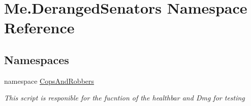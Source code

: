 \hypertarget{namespaceMe_1_1DerangedSenators}{}\section{Me.\+Deranged\+Senators Namespace Reference}
\label{namespaceMe_1_1DerangedSenators}
\subsection*{Namespaces}
\begin{DoxyCompactItemize}
\item 
namespace \hyperlink{namespaceMe_1_1DerangedSenators_1_1CopsAndRobbers}{Cops\+And\+Robbers}
\begin{DoxyCompactList}\small\item\em This script is responible for the fucntion of the healthbar and Dmg for testing \end{DoxyCompactList}\end{DoxyCompactItemize}
